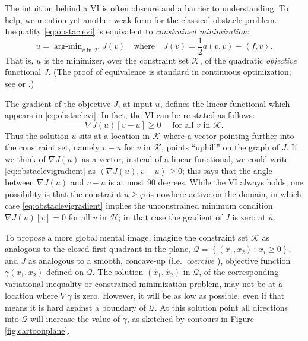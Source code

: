 \documentclass[letterpaper,final,12pt,reqno]{amsart}
\newcommand{\ip}[2]{\left<#1,#2\right>}
\numberwithin{equation}{section}
\numberwithin{figure}{section}
\numberwithin{table}{section}
\begin{document}
The intuition behind a VI is often obscure and a barrier to understanding.  To help, we mention yet another weak form for the classical obstacle problem.  Inequality \eqref{eq:obstaclevi} is equivalent to \emph{constrained minimization}:
\newcommand{\argmin}{\mathop{\mathrm{arg\text{-}min}}}
\begin{equation}
  u = \argmin_{v \text{ in } \mathcal{K}} J(v) \quad \text{where} \quad J(v) = \frac{1}{2} a(v,v) - \ip{f}{v}. \label{eq:obstaclemin}
\end{equation}
That is, $u$ is the minimizer, over the constraint set $\mathcal{K}$, of the quadratic \emph{objective} functional $J$.  (The proof of equivalence is standard in continuous optimization; see \cite{KinderlehrerStampacchia1980} or \cite[Chapter 12]{Bueler2021}.)

The gradient of the objective $J$, at input $u$, defines the linear functional which appears in \eqref{eq:obstaclevi}.  In fact, the VI can be re-stated as follows:
\begin{equation}
  \nabla J(u)[v-u] \ge 0 \quad \text{ for all } v \text{ in } \mathcal{K}. \label{eq:obstaclevigradient}
\end{equation}
Thus the solution $u$ sits at a location in $\mathcal{K}$ where a vector pointing further into the constraint set, namely $v-u$ for $v$ in $\mathcal{K}$, points ``uphill'' on the graph of $J$.  If we think of $\nabla J(u)$ as a vector, instead of a linear functional, we could write \eqref{eq:obstaclevigradient} as $\ip{\nabla J(u)}{v-u} \ge 0$; this says that the angle between $\nabla J(u)$ and $v-u$ is at most 90 degrees.  While the VI always holds, one possibility is that the constraint $u\ge \varphi$ is nowhere active on the domain, in which case \eqref{eq:obstaclevigradient} implies the unconstrained minimum condition $\nabla J(u)[v] = 0$ for all $v$ in $\mathcal{H}$; in that case the gradient of $J$ is zero at $u$.

To propose a more global mental image, imagine the constraint set $\mathcal{K}$ as analogous to the closed first quadrant in the plane, $\mathcal{Q} = \left\{(x_1,x_2)\,:\,x_i\ge 0\right\}$, and $J$ as analogous to a smooth, concave-up (i.e.~\emph{coercive} \cite{Evans2010}), objective function $\gamma(x_1,x_2)$ defined on $\mathcal{Q}$.  The solution $(\hat x_1,\hat x_2)$ in $\mathcal{Q}$, of the corresponding variational inequality or constrained minimization problem, may not be at a location where $\nabla \gamma$ is zero.  However, it will be as low as possible, even if that means it is hard against a boundary of $\mathcal{Q}$.  At this solution point all directions into $\mathcal{Q}$ will increase the value of $\gamma$, as sketched by contours in Figure \ref{fig:cartoonplane}.
\end{document}
